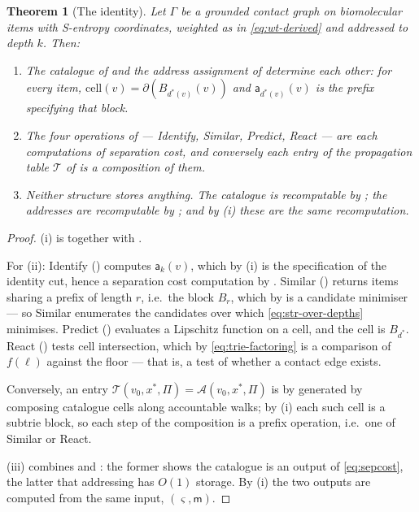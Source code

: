 \documentclass[11pt,twocolumn,a4paper]{article}
\theoremstyle{thmstyle}
\newtheorem{theorem}{Theorem}[section]
\theoremstyle{definition}
\theoremstyle{remark}
\newcommand{\Gph}{\Gamma}
\newcommand{\med}{\mathsf{m}}
\newcommand{\cut}{\partial}
\newcommand{\acc}{\mathcal{A}}
\newcommand{\Proc}{\Pi}
\newcommand{\Tab}{\mathcal{T}}
\newcommand{\sse}{\varsigma}
\newcommand{\addr}{\mathsf{a}}
\begin{document}
\begin{theorem}[The identity]
\label{thm:identity}
Let $\Gph$ be a grounded contact graph on biomolecular items with
S-entropy coordinates, weighted as in \eqref{eq:wt-derived} and
addressed to depth $k$. Then:
\begin{enumerate}[label=(\roman*),leftmargin=*]
\item The catalogue of  and the address assignment
      of  determine each other: for every item,
      $\mathrm{cell}(v) = \cut(B_{d^{*}(v)}(v))$ and
      $\addr_{d^{*}(v)}(v)$ is the prefix specifying that block.
\item The four operations of  --- Identify,
      Similar, Predict, React --- are each computations of separation
      cost, and conversely each entry of the propagation table $\Tab$
      of  is a composition of them.
\item Neither structure stores anything. The catalogue is recomputable
      by ; the addresses are recomputable by
      ; and by (i) these are the same
      recomputation.
\end{enumerate}
\end{theorem}

\begin{proof}
(i) is  together with
.

For (ii): Identify () computes $\addr_k(v)$, which
by (i) is the specification of the identity cut, hence a separation
cost computation by . Similar
() returns items sharing a prefix of length $r$, i.e.\
the block $B_r$, which by  is a candidate
minimiser --- so Similar enumerates the candidates over which
\eqref{eq:str-over-depths} minimises. Predict ()
evaluates a Lipschitz function on a cell, and the cell is
$B_{d^{*}}$. React () tests cell intersection, which by
\eqref{eq:trie-factoring} is a comparison of $f(\ell)$ against the
floor --- that is, a test of whether a contact edge exists.

Conversely, an entry $\Tab(v_0,x^{*},\Proc) = \acc(v_0,x^{*},\Proc)$ is
by \Cref{thm:catalogue-table} generated by composing catalogue cells
along accountable walks; by (i) each such cell is a subtrie block, so
each step of the composition is a prefix operation, i.e.\ one of
Similar or React.

(iii) combines  and : the
former shows the catalogue is an output of \eqref{eq:sepcost}, the
latter that addressing has $O(1)$ storage. By (i) the two outputs are
computed from the same input, $(\sse, \med)$.
\end{proof}
\end{document}

